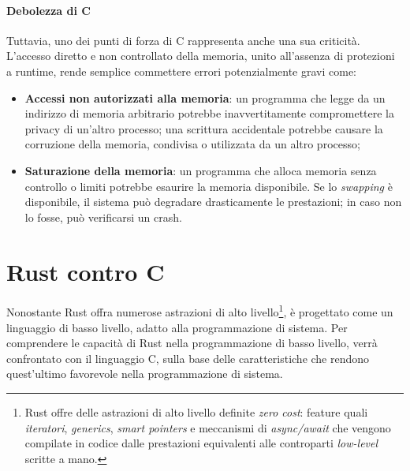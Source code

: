 \paragraph{Debolezza di C}
Tuttavia, uno dei punti di forza di C rappresenta anche una sua criticità. 
L'accesso diretto e non controllato della memoria, unito all'assenza di protezioni a runtime, rende semplice
commettere errori potenzialmente gravi come:
\begin{itemize}
    \item \textbf{Accessi non autorizzati alla memoria}: un programma che legge da un indirizzo di memoria arbitrario potrebbe inavvertitamente compromettere la privacy di un'altro processo; una scrittura accidentale potrebbe causare la corruzione della memoria, condivisa o utilizzata da un altro processo;
    \item \textbf{Saturazione della memoria}: un programma che alloca memoria senza controllo o limiti potrebbe esaurire la memoria disponibile. Se lo \textit{swapping} è disponibile, il sistema può degradare drasticamente le prestazioni; in caso non lo fosse, può verificarsi un crash.
\end{itemize}

\section{Rust contro C}
Nonostante Rust offra numerose astrazioni di alto livello\footnote{Rust offre delle astrazioni di alto livello definite \textit{zero cost}: feature quali \textit{iteratori}, \textit{generics}, \textit{smart pointers} e meccanismi di \textit{async/await} che vengono compilate in codice dalle prestazioni equivalenti alle controparti \textit{low-level} scritte a mano.}, è progettato come un linguaggio di basso livello, 
adatto alla programmazione di sistema.
Per comprendere le capacità di Rust nella programmazione di basso livello, verrà confrontato con il linguaggio C, sulla 
base delle caratteristiche che rendono quest'ultimo favorevole nella programmazione di sistema.

